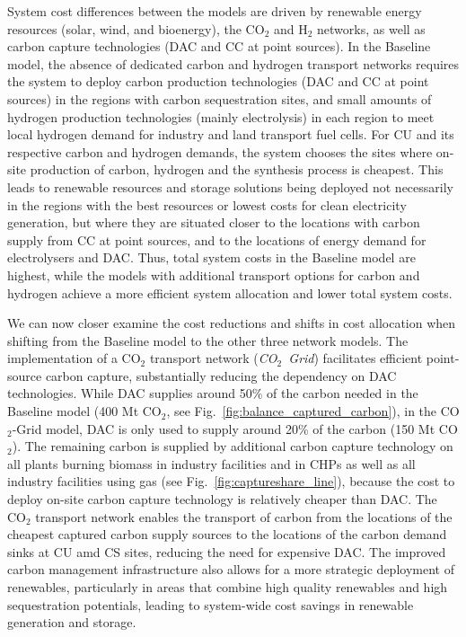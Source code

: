 \documentclass[twocolumn]{article}
\newcommand{\carbon}{CO$_2$}
\newcommand{\hydrogen}{H$_2$}
\newcommand{\modCO}{CO$_2$-Grid model}
\begin{document}
System cost differences between the models are driven by renewable energy resources (solar, wind, and bioenergy), the \carbon{} and \hydrogen{} networks, as well as carbon capture technologies (DAC and CC at point sources).
In the Baseline model, the absence of dedicated carbon and hydrogen transport networks requires the system to deploy carbon production technologies (DAC and CC at point sources) in the regions with carbon sequestration sites, and small amounts of hydrogen production technologies (mainly electrolysis) in each region to meet local hydrogen demand for industry and land transport fuel cells.
For CU and its respective carbon and hydrogen demands, the system chooses the sites where on-site production of carbon, hydrogen and the synthesis process is cheapest. This leads to renewable resources and storage solutions being deployed not necessarily in the regions with the best resources or lowest costs for clean electricity generation, but where they are situated closer to the locations with carbon supply from CC at point sources, and to the locations of energy demand for electrolysers and DAC.
Thus, total system costs in the Baseline model are highest, while the models with additional transport options for carbon and hydrogen achieve a more efficient system allocation and lower total system costs.

We can now closer examine the cost reductions and shifts in cost allocation when shifting from the Baseline model to the other three network models.
The implementation of a \carbon{} transport network (\textit{\carbon{}~Grid}) facilitates efficient point-source carbon capture, substantially reducing the dependency on DAC technologies. While DAC supplies around 50\% of the carbon needed in the Baseline model (400 Mt \carbon{}, see Fig.~\ref{fig:balance_captured_carbon}), in the \modCO{}, DAC is only used to supply around 20\% of the carbon (150 Mt \carbon{}). The remaining carbon is supplied by additional carbon capture technology on all plants burning biomass in industry facilities and in CHPs as well as all industry facilities using gas (see Fig.~\ref{fig:captureshare_line}), because the cost to deploy on-site carbon capture technology is relatively cheaper than DAC. The \carbon{} transport network enables the transport of carbon from the locations of the cheapest captured carbon supply sources to the locations of the carbon demand sinks at CU amd CS sites, reducing the need for expensive DAC. The improved carbon management infrastructure also allows for a more strategic deployment of renewables, particularly in areas that combine high quality renewables and high sequestration potentials, leading to system-wide cost savings in renewable generation and storage.
\end{document}
